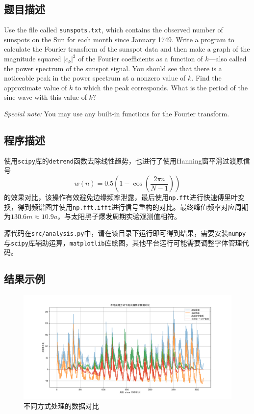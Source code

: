 \subsection{题目描述}
\noindent Use the file called \texttt{sunspots.txt}, which contains the observed number of sunspots on the Sun for each month since January 1749. Write a program to calculate the Fourier transform of the sunspot data and then make a graph of the magnitude squared \( |c_k|^2 \) of the Fourier coefficients as a function of \( k \)—also called the power spectrum of the sunspot signal. You should see that there is a noticeable peak in the power spectrum at a nonzero value of \( k \). Find the approximate value of \( k \) to which the peak corresponds. What is the period of the sine wave with this value of \( k \)?

\noindent \textit{Special note:} You may use any built-in functions for the Fourier transform.


\subsection{程序描述}
使用\texttt{scipy}库的\texttt{detrend}函数去除线性趋势，也进行了使用Hanning窗平滑过渡原信号
\[
w(n) = 0.5 \left( 1 - \cos\left( \frac{2\pi n}{N-1} \right) \right)
\]
的效果对比，该操作有效避免边缘频率泄露，最后使用\texttt{np.fft}进行快速傅里叶变换，得到频谱图并使用\texttt{np.fft.ifft}进行信号重构的对比。最终峰值频率对应周期为$130.6 m\approx10.9 a$，与太阳黑子爆发周期实验观测值相符。

源代码在\texttt{src/analysis.py}中，请在该目录下运行即可得到结果，需要安装\texttt{numpy}与\texttt{scipy}库辅助运算，\texttt{matplotlib}库绘图，其他平台运行可能需要调整字体管理代码。
\subsection{结果示例}
\begin{figure}[H]
    \centering
    \includegraphics[width=1.0\textwidth]{Problem_2/figs/comparison.png}
    \caption{不同方式处理的数据对比}
\end{figure}

